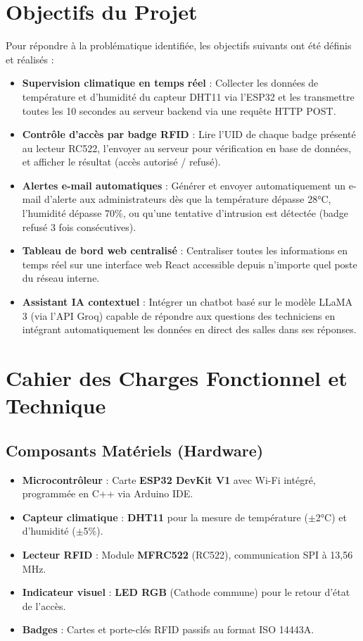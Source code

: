 \documentclass[12pt,a4paper]{report}
\begin{document}
\section{Objectifs du Projet}
Pour répondre à la problématique identifiée, les objectifs suivants ont été définis et réalisés :
\begin{itemize}
    \item \textbf{Supervision climatique en temps réel} : Collecter les données de température et d'humidité du capteur DHT11 via l'ESP32 et les transmettre toutes les 10 secondes au serveur backend via une requête HTTP POST.
    \item \textbf{Contrôle d'accès par badge RFID} : Lire l'UID de chaque badge présenté au lecteur RC522, l'envoyer au serveur pour vérification en base de données, et afficher le résultat (accès autorisé / refusé).
    \item \textbf{Alertes e-mail automatiques} : Générer et envoyer automatiquement un e-mail d'alerte aux administrateurs dès que la température dépasse 28°C, l'humidité dépasse 70\%, ou qu'une tentative d'intrusion est détectée (badge refusé 3 fois consécutives).
    \item \textbf{Tableau de bord web centralisé} : Centraliser toutes les informations en temps réel sur une interface web React accessible depuis n'importe quel poste du réseau interne.
    \item \textbf{Assistant IA contextuel} : Intégrer un chatbot basé sur le modèle LLaMA 3 (via l'API Groq) capable de répondre aux questions des techniciens en intégrant automatiquement les données en direct des salles dans ses réponses.
\end{itemize}

\section{Cahier des Charges Fonctionnel et Technique}

\subsection{Composants Matériels (Hardware)}
\begin{itemize}
    \item \textbf{Microcontrôleur} : Carte \textbf{ESP32 DevKit V1} avec Wi-Fi intégré, programmée en C++ via Arduino IDE.
    \item \textbf{Capteur climatique} : \textbf{DHT11} pour la mesure de température ($\pm$2°C) et d'humidité ($\pm$5\%).
    \item \textbf{Lecteur RFID} : Module \textbf{MFRC522} (RC522), communication SPI à 13,56 MHz.
    \item \textbf{Indicateur visuel} : \textbf{LED RGB} (Cathode commune) pour le retour d'état de l'accès.
    \item \textbf{Badges} : Cartes et porte-clés RFID passifs au format ISO 14443A.
\end{itemize}
\end{document}
